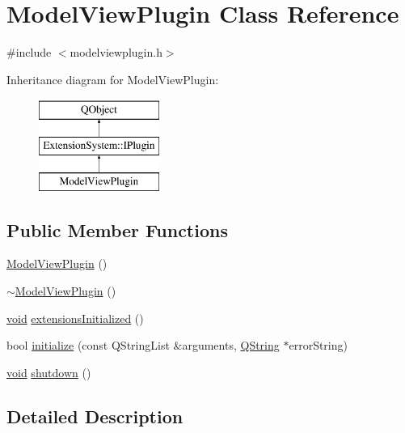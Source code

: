 \hypertarget{class_model_view_plugin}{\section{Model\-View\-Plugin Class Reference}
\label{class_model_view_plugin}
}


{\ttfamily \#include $<$modelviewplugin.\-h$>$}

Inheritance diagram for Model\-View\-Plugin\-:\begin{figure}[H]
\begin{center}
\leavevmode
\includegraphics[height=3.000000cm]{class_model_view_plugin}
\end{center}
\end{figure}
\subsection*{Public Member Functions}
\begin{DoxyCompactItemize}
\item 
\hyperlink{group___model_view_plugin_gafbc74cc8c17048cddb875add75e65cad}{Model\-View\-Plugin} ()
\item 
\hyperlink{group___model_view_plugin_gac1d370684cf595a557c80ee2d6572e39}{$\sim$\-Model\-View\-Plugin} ()
\item 
\hyperlink{group___u_a_v_objects_plugin_ga444cf2ff3f0ecbe028adce838d373f5c}{void} \hyperlink{group___model_view_plugin_gaf0ae0222c081f943759de1e0697df04e}{extensions\-Initialized} ()
\item 
bool \hyperlink{group___model_view_plugin_ga6f9214b4e1b72063475d8351046df6bb}{initialize} (const Q\-String\-List \&arguments, \hyperlink{group___u_a_v_objects_plugin_gab9d252f49c333c94a72f97ce3105a32d}{Q\-String} $\ast$error\-String)
\item 
\hyperlink{group___u_a_v_objects_plugin_ga444cf2ff3f0ecbe028adce838d373f5c}{void} \hyperlink{group___model_view_plugin_gad3a367fabe72d1e3a0063267d0170df9}{shutdown} ()
\end{DoxyCompactItemize}


\subsection{Detailed Description}


